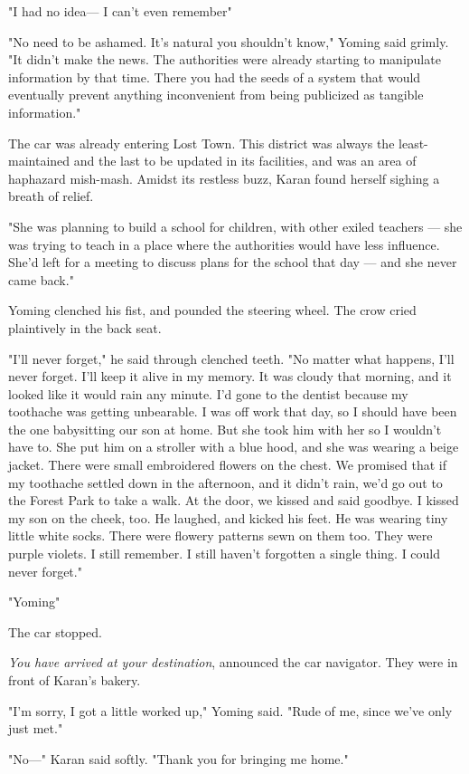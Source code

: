 "I had no idea--- I can't even remember\el "

"No need to be ashamed. It's natural you shouldn't know," Yoming said
grimly. "It didn't make the news. The authorities were already starting
to manipulate information by that time. There you had the seeds of a
system that would eventually prevent anything inconvenient from being
publicized as tangible information."

The car was already entering Lost Town. This district was always the
least-maintained and the last to be updated in its facilities, and was
an area of haphazard mish-mash. Amidst its restless buzz, Karan found
herself sighing a breath of relief.

"She was planning to build a school for children, with other exiled
teachers --- she was trying to teach in a place where the authorities
would have less influence. She'd left for a meeting to discuss plans for
the school that day --- and she never came back."

Yoming clenched his fist, and pounded the steering wheel. The crow cried
plaintively in the back seat.

"I'll never forget," he said through clenched teeth. "No matter what
happens, I'll never forget. I'll keep it alive in my memory. It was
cloudy that morning, and it looked like it would rain any minute. I'd
gone to the dentist because my toothache was getting unbearable. I was
off work that day, so I should have been the one babysitting our son at
home. But she took him with her so I wouldn't have to. She put him on a
stroller with a blue hood, and she was wearing a beige jacket. There
were small embroidered flowers on the chest. We promised that if my
toothache settled down in the afternoon, and it didn't rain, we'd go out
to the Forest Park to take a walk. At the door, we kissed and said
goodbye. I kissed my son on the cheek, too. He laughed, and kicked his
feet. He was wearing tiny little white socks. There were flowery
patterns sewn on them too. They were purple violets. I still remember. I
still haven't forgotten a single thing. I could never forget."

"Yoming\el "

The car stopped.

\emph{You have arrived at your destination}, announced the car navigator. They
were in front of Karan's bakery.

"I'm sorry, I got a little worked up," Yoming said. "Rude of me, since
we've only just met."

"No---" Karan said softly. "Thank you for bringing me home."

